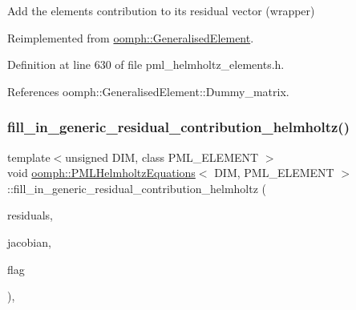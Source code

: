 Add the element\textquotesingle{}s contribution to its residual vector (wrapper) 



Reimplemented from \hyperlink{classoomph_1_1GeneralisedElement_a310c97f515e8504a48179c0e72c550d7}{oomph\+::\+Generalised\+Element}.



Definition at line 630 of file pml\+\_\+helmholtz\+\_\+elements.\+h.



References oomph\+::\+Generalised\+Element\+::\+Dummy\+\_\+matrix.

\mbox{\label{classoomph_1_1PMLHelmholtzEquations_ac066463c7af3e2f30146e47553508bce}} 
\subsubsection{\texorpdfstring{fill\+\_\+in\+\_\+generic\+\_\+residual\+\_\+contribution\+\_\+helmholtz()}{fill\_in\_generic\_residual\_contribution\_helmholtz()}}
{\footnotesize\ttfamily template$<$unsigned D\+IM, class P\+M\+L\+\_\+\+E\+L\+E\+M\+E\+NT $>$ \\
void \hyperlink{classoomph_1_1PMLHelmholtzEquations}{oomph\+::\+P\+M\+L\+Helmholtz\+Equations}$<$ D\+IM, P\+M\+L\+\_\+\+E\+L\+E\+M\+E\+NT $>$\+::fill\+\_\+in\+\_\+generic\+\_\+residual\+\_\+contribution\+\_\+helmholtz (\begin{DoxyParamCaption}\item[{\hyperlink{classoomph_1_1Vector}{Vector}$<$ double $>$ \&}]{residuals,  }\item[{\hyperlink{classoomph_1_1DenseMatrix}{Dense\+Matrix}$<$ double $>$ \&}]{jacobian,  }\item[{const unsigned \&}]{flag }\end{DoxyParamCaption})\hspace{0.3cm}{\ttfamily [protected]}, {\ttfamily [virtual]}}



